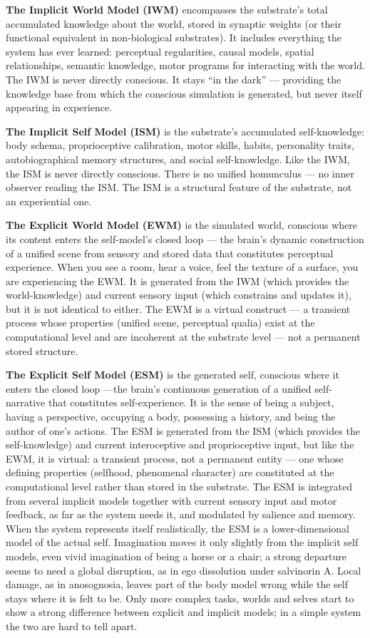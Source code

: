\documentclass[12pt]{article}
\begin{document}
\textbf{The Implicit World Model (IWM)} encompasses the substrate's total accumulated knowledge about the world, stored in synaptic weights (or their functional equivalent in non-biological substrates). It includes everything the system has ever learned: perceptual regularities, causal models, spatial relationships, semantic knowledge, motor programs for interacting with the world. The IWM is never directly conscious. It stays ``in the dark'' --- providing the knowledge base from which the conscious simulation is generated, but never itself appearing in experience.

\textbf{The Implicit Self Model (ISM)} is the substrate's accumulated self-knowledge: body schema, proprioceptive calibration, motor skills, habits, personality traits, autobiographical memory structures, and social self-knowledge. Like the IWM, the ISM is never directly conscious. There is no unified homunculus --- no inner observer reading the ISM. The ISM is a structural feature of the substrate, not an experiential one.

\textbf{The Explicit World Model (EWM)} is the simulated world, conscious where its content enters the self-model's closed loop --- the brain's dynamic construction of a unified scene from sensory and stored data that constitutes perceptual experience. When you see a room, hear a voice, feel the texture of a surface, you are experiencing the EWM. It is generated from the IWM (which provides the world-knowledge) and current sensory input (which constrains and updates it), but it is not identical to either. The EWM is a virtual construct --- a transient process whose properties (unified scene, perceptual qualia) exist at the computational level and are incoherent at the substrate level --- not a permanent stored structure.

\textbf{The Explicit Self Model (ESM)} is the generated self, conscious where it enters the closed loop ---the brain's continuous generation of a unified self-narrative that constitutes self-experience. It is the sense of being a subject, having a perspective, occupying a body, possessing a history, and being the author of one's actions. The ESM is generated from the ISM (which provides the self-knowledge) and current interoceptive and proprioceptive input, but like the EWM, it is virtual: a transient process, not a permanent entity --- one whose defining properties (selfhood, phenomenal character) are constituted at the computational level rather than stored in the substrate. The ESM is integrated from several implicit models together with current sensory input and motor feedback, as far as the system needs it, and modulated by salience and memory. When the system represents itself realistically, the ESM is a lower-dimensional model of the actual self. Imagination moves it only slightly from the implicit self models, even vivid imagination of being a horse or a chair; a strong departure seems to need a global disruption, as in ego dissolution under salvinorin A. Local damage, as in anosognosia, leaves part of the body model wrong while the self stays where it is felt to be. Only more complex tasks, worlds and selves start to show a strong difference between explicit and implicit models; in a simple system the two are hard to tell apart.
\end{document}
